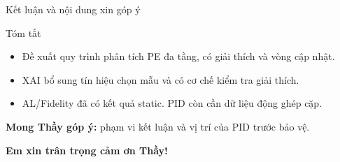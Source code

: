 \documentclass[aspectratio=169,10pt]{beamer}
\newcommand{\key}[1]{\textcolor{UETBlue}{\textbf{#1}}}
\begin{document}
\begin{frame}{Kết luận và nội dung xin góp ý}
\begin{block}{Tóm tắt}
  \begin{itemize}
    \setlength{\itemsep}{.15cm}
    \item Đề xuất quy trình phân tích PE đa tầng, có giải thích và vòng cập nhật.
    \item XAI bổ sung tín hiệu chọn mẫu và có cơ chế kiểm tra giải thích.
    \item AL/Fidelity đã có kết quả static. PID còn cần dữ liệu động ghép cặp.
  \end{itemize}
\end{block}
\vspace{.14cm}
\key{Mong Thầy góp ý:} phạm vi kết luận và vị trí của PID trước bảo vệ.
\vspace{.35cm}
\begin{center}
  {\Large\bfseries\color{UETBlue}Em xin trân trọng cảm ơn Thầy!}
\end{center}
\end{frame}
\end{document}
